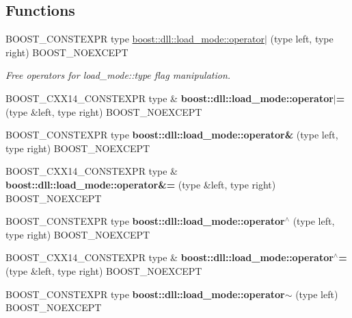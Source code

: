 \subsection*{Functions}
\begin{DoxyCompactItemize}
\item 
B\+O\+O\+S\+T\+\_\+\+C\+O\+N\+S\+T\+E\+X\+PR type \hyperlink{a00729_affd5b229588eb423b018e50119809564}{boost\+::dll\+::load\+\_\+mode\+::operator$\vert$} (type left, type right) B\+O\+O\+S\+T\+\_\+\+N\+O\+E\+X\+C\+E\+PT\hypertarget{a00729_affd5b229588eb423b018e50119809564}{}\label{a00729_affd5b229588eb423b018e50119809564}

\begin{DoxyCompactList}\small\item\em Free operators for load\+\_\+mode\+::type flag manipulation. \end{DoxyCompactList}\item 
B\+O\+O\+S\+T\+\_\+\+C\+X\+X14\+\_\+\+C\+O\+N\+S\+T\+E\+X\+PR type \& {\bfseries boost\+::dll\+::load\+\_\+mode\+::operator$\vert$=} (type \&left, type right) B\+O\+O\+S\+T\+\_\+\+N\+O\+E\+X\+C\+E\+PT\hypertarget{a00729_a8a56194d67dabdf7edc67d3292ed80e9}{}\label{a00729_a8a56194d67dabdf7edc67d3292ed80e9}

\item 
B\+O\+O\+S\+T\+\_\+\+C\+O\+N\+S\+T\+E\+X\+PR type {\bfseries boost\+::dll\+::load\+\_\+mode\+::operator\&} (type left, type right) B\+O\+O\+S\+T\+\_\+\+N\+O\+E\+X\+C\+E\+PT\hypertarget{a00729_af79db4e95b93694741e3b54831ed04aa}{}\label{a00729_af79db4e95b93694741e3b54831ed04aa}

\item 
B\+O\+O\+S\+T\+\_\+\+C\+X\+X14\+\_\+\+C\+O\+N\+S\+T\+E\+X\+PR type \& {\bfseries boost\+::dll\+::load\+\_\+mode\+::operator\&=} (type \&left, type right) B\+O\+O\+S\+T\+\_\+\+N\+O\+E\+X\+C\+E\+PT\hypertarget{a00729_ac930a313c87df4a88189c2585a719d38}{}\label{a00729_ac930a313c87df4a88189c2585a719d38}

\item 
B\+O\+O\+S\+T\+\_\+\+C\+O\+N\+S\+T\+E\+X\+PR type {\bfseries boost\+::dll\+::load\+\_\+mode\+::operator$^\wedge$} (type left, type right) B\+O\+O\+S\+T\+\_\+\+N\+O\+E\+X\+C\+E\+PT\hypertarget{a00729_a1562aeea90b163e98ee50ad849df2397}{}\label{a00729_a1562aeea90b163e98ee50ad849df2397}

\item 
B\+O\+O\+S\+T\+\_\+\+C\+X\+X14\+\_\+\+C\+O\+N\+S\+T\+E\+X\+PR type \& {\bfseries boost\+::dll\+::load\+\_\+mode\+::operator$^\wedge$=} (type \&left, type right) B\+O\+O\+S\+T\+\_\+\+N\+O\+E\+X\+C\+E\+PT\hypertarget{a00729_a3da32e46729782111a72e2e3aa7490fb}{}\label{a00729_a3da32e46729782111a72e2e3aa7490fb}

\item 
B\+O\+O\+S\+T\+\_\+\+C\+O\+N\+S\+T\+E\+X\+PR type {\bfseries boost\+::dll\+::load\+\_\+mode\+::operator$\sim$} (type left) B\+O\+O\+S\+T\+\_\+\+N\+O\+E\+X\+C\+E\+PT\hypertarget{a00729_a081f141841a6896b40cf39d233118922}{}\label{a00729_a081f141841a6896b40cf39d233118922}

\end{DoxyCompactItemize}


